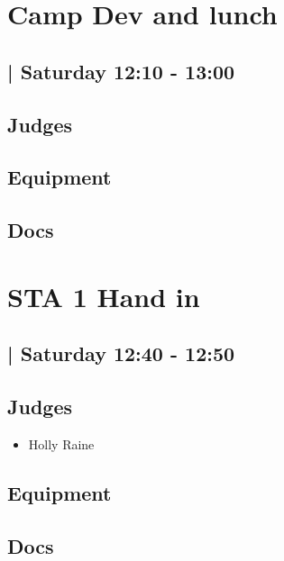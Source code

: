 \documentclass[10pt]{article}
\begin{document}
		\begin{minipage}{\linewidth}
		\setcounter{section}{22}
	\section{Camp Dev and lunch }
	\subsection*{ | Saturday 12:10 - 13:00}

	

	\begin{multicols}{2}
	\subsection*{\faUsers \: Judges}
	\begin{itemize}
		\end{itemize}
	\columnbreak
	\subsection*{\faWrench \: Equipment}
	        \vfill\null
        \subsection*{\faFile \: Docs}
     	\end{multicols}


	\vspace{1cm}
	\end{minipage}

		\begin{minipage}{\linewidth}
		\setcounter{section}{23}
	\section{STA 1 Hand in }
	\subsection*{ | Saturday 12:40 - 12:50}

	

	\begin{multicols}{2}
	\subsection*{\faUsers \: Judges}
	\begin{itemize}
			\item Holly Raine
		\end{itemize}
	\columnbreak
	\subsection*{\faWrench \: Equipment}
	        \vfill\null
        \subsection*{\faFile \: Docs}
     	\end{multicols}


	\vspace{1cm}
	\end{minipage}
\end{document}
